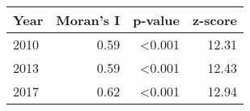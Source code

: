 \begin{tabular}{l r r r}
\toprule
Year & Moran's I & p-value & z-score \\
\midrule
2010  &  0.59  &  \textless{}0.001  &  12.31 \\
2013  &  0.59  &  \textless{}0.001  &  12.43 \\
2017  &  0.62  &  \textless{}0.001  &  12.94 \\
\bottomrule
\end{tabular}
